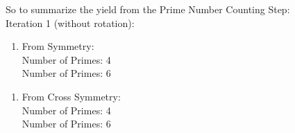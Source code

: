 So to summarize the yield from the Prime Number Counting Step:\\
Iteration 1 (without rotation):\\
\begin{enumerate}
\item From Symmetry: \\
\subitem Number of Primes: 4\\
\subitem Number of Primes: 6\\
\end{enumerate}

\begin{enumerate}
\item From Cross Symmetry:\\
\subitem Number of Primes: 4\\
\subitem Number of Primes: 6\\
\end{enumerate}

